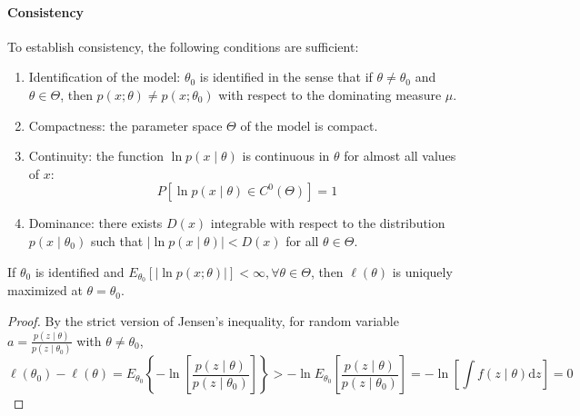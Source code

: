 \paragraph{Consistency}

To establish consistency, the following conditions are sufficient:
\begin{enumerate}
    \item Identification of the model: $\theta_{0}$ is identified in the sense that if $\theta\neq\theta_{0}$ and $\theta\in\Theta$, then $p(x;\theta)\neq p\left(x;\theta_{0}\right)$ with respect to the dominating measure $\mu$.
    \item Compactness: the parameter space $\Theta$ of the model is compact.
    \item Continuity: the function $\ln p(x\mid\theta)$ is continuous in $\theta$ for almost all values of $x$:
          \begin{equation}
              P\left[\ln p(x\mid\theta)\in C^{0}(\Theta)\right]=1
          \end{equation}
    \item Dominance: there exists $D(x)$ integrable with respect to the distribution $p\left(x\mid\theta_{0}\right)$ such that $|\ln p\left(x\mid\theta\right)|<D(x)$ for all $\theta\in \Theta$.
\end{enumerate}

\begin{lemma}
    If $\theta_{0}$ is identified and $E_{\theta_{0}}\left[|\ln p(x;\theta)|\right]<\infty,\forall\theta\in\Theta$, then $\ell(\theta)$ is uniquely maximized at $\theta=\theta_{0}$.
\end{lemma}

\begin{proof}
    By the strict version of Jensen's inequality, for random variable $a=\frac{p(z\mid\theta)}{p(z\mid\theta_{0})}$ with $\theta\neq\theta_{0}$,
    \begin{equation}
        \ell\left(\theta_{0}\right)-\ell(\theta)=E_{\theta_{0}}\left\{-\ln\left[\frac{p(z\mid\theta)}{p(z\mid\theta_{0})}\right]\right\}>-\ln E_{\theta_{0}}\left[\frac{p(z\mid\theta)}{p(z\mid\theta_{0})}\right]=-\ln \left[\int f(z \mid \theta) \mathrm{d} z\right]=0
    \end{equation}
\end{proof}

